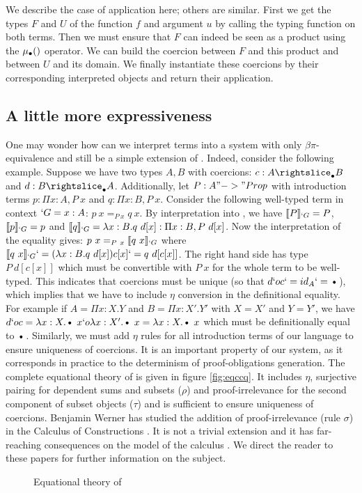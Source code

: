 \documentclass{llncs}
\begin{document}
We describe the case of application here; others are similar. First we
get the \Russell types $F$ and $U$ of the function $f$ and argument $u$ by calling the
typing function on both terms. Then we must ensure that $F$ can indeed
be seen as a product using the $\mualgo$ operator. We can build
the coercion between $F$ and this product and between $U$ and its
domain. We finally instantiate these coercions by their corresponding
interpreted objects and return their application.

\subsection{A little more expressiveness}
One may wonder how can we interpret \Russell terms into a system with only
$\beta\pi$-equivalence and still be a simple extension of \CIC. 
Indeed, consider the following example. Suppose we have two types $A, B$
with coercions: $c : A \suba B$ and $d : B \suba A$. Additionally, let
$P : A "->" Prop$ with introduction terms $p : \Pi x : A, P~x$ and $q :
\Pi x : B, P~x$. Consider the following well-typed \Russell term in
context $`G = x : A$: $p~x =_{P~x} q~x$. By interpretation into \CIC, we
have $\llbracket P \rrbracket_{`G} = P$, $\llbracket p \rrbracket_{`G} = p$ and $\llbracket q \rrbracket_{`G} = \lambda x :
B. q~d[x] : \Pi x : B, P~d[x]$. Now the interpretation of the equality
gives:
$p~x =_{P~x} \llbracket q~x \rrbracket_{`G}$ where $\llbracket q~x \rrbracket_{`G} `= (\lambda x : B. q~d[x]) c[x] `=
q~d[c[x]]$. The right hand side has type $P~d[c[x]]$ which must be
convertible with $P~x$ for the whole term to be well-typed. This
indicates that coercions must be unique (so that $d `o c `= id_A `=
\ctxdot$), which implies that we have to include $\eta$ 
conversion in the definitional equality. For
example if $A = \Pi x : X.Y$ and $B = \Pi x : X'.Y'$ with $X = X'$ and
$Y = Y'$, we have $d `o c = \lambda x : X. \ctxdot~x `o \lambda x
: X'. \ctxdot~x = \lambda x : X. \ctxdot~x$ which must be definitionally
equal to $\ctxdot$.
Similarly, we must add $\eta$ rules for all introduction terms of our
language to ensure uniqueness of coercions. It is an important
property of our system, as it corresponds in practice to the determinism
of proof-obligations
generation. The complete equational theory of \CICq{} is given in figure
\vref{fig:eqccq}. It includes $\eta$, surjective pairing for dependent
sums and subsets ($\rho$) and proof-irrelevance for the second component
of subset objects ($\tau$) and is sufficient to ensure uniqueness of coercions.
Benjamin Werner has studied the addition of proof-irrelevance (rule
$\sigma$) in the Calculus of Constructions
\cite{Werner:ProofIrrelevance}. It is not a trivial extension and it has
far-reaching consequences on the model of the calculus
\cite{DBLP:conf/types/MiquelW02}. We direct the reader to these papers for further
information on the subject.
\begin{figure}[ht]
  \vspace{-1em}
  \ccqeqarr
  \vspace{-1em}
  \caption{Equational theory of \CICq}
  \label{fig:eqccq}
  \vspace{-1em}
\end{figure}
\end{document}

